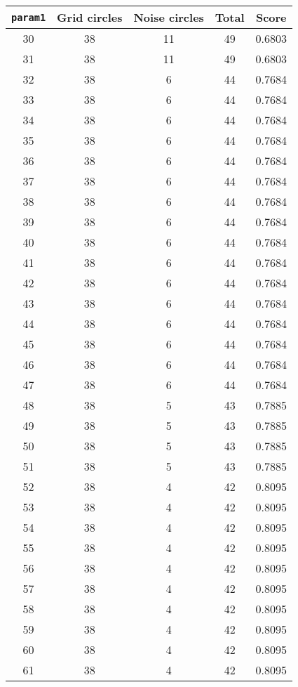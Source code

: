 \documentclass[letterpaper, 12pt]{article}
\begin{document}
\begin{longtable}{|c|c|c|c|c|}
\hline
\textbf{\texttt{param1}} & \textbf{Grid circles} & \textbf{Noise circles} & \textbf{Total} & \textbf{Score} \\
\hline
30 & 38 & 11 & 49 & 0.6803 \\
\hline
31 & 38 & 11 & 49 & 0.6803 \\
\hline
32 & 38 & 6 & 44 & 0.7684 \\
\hline
33 & 38 & 6 & 44 & 0.7684 \\
\hline
34 & 38 & 6 & 44 & 0.7684 \\
\hline
35 & 38 & 6 & 44 & 0.7684 \\
\hline
36 & 38 & 6 & 44 & 0.7684 \\
\hline
37 & 38 & 6 & 44 & 0.7684 \\
\hline
38 & 38 & 6 & 44 & 0.7684 \\
\hline
39 & 38 & 6 & 44 & 0.7684 \\
\hline
40 & 38 & 6 & 44 & 0.7684 \\
\hline
41 & 38 & 6 & 44 & 0.7684 \\
\hline
42 & 38 & 6 & 44 & 0.7684 \\
\hline
43 & 38 & 6 & 44 & 0.7684 \\
\hline
44 & 38 & 6 & 44 & 0.7684 \\
\hline
45 & 38 & 6 & 44 & 0.7684 \\
\hline
46 & 38 & 6 & 44 & 0.7684 \\
\hline
47 & 38 & 6 & 44 & 0.7684 \\
\hline
48 & 38 & 5 & 43 & 0.7885 \\
\hline
49 & 38 & 5 & 43 & 0.7885 \\
\hline
50 & 38 & 5 & 43 & 0.7885 \\
\hline
51 & 38 & 5 & 43 & 0.7885 \\
\hline
52 & 38 & 4 & 42 & 0.8095 \\
\hline
53 & 38 & 4 & 42 & 0.8095 \\
\hline
54 & 38 & 4 & 42 & 0.8095 \\
\hline
55 & 38 & 4 & 42 & 0.8095 \\
\hline
56 & 38 & 4 & 42 & 0.8095 \\
\hline
57 & 38 & 4 & 42 & 0.8095 \\
\hline
58 & 38 & 4 & 42 & 0.8095 \\
\hline
59 & 38 & 4 & 42 & 0.8095 \\
\hline
60 & 38 & 4 & 42 & 0.8095 \\
\hline
61 & 38 & 4 & 42 & 0.8095 \\

\end{longtable}
\end{document}
